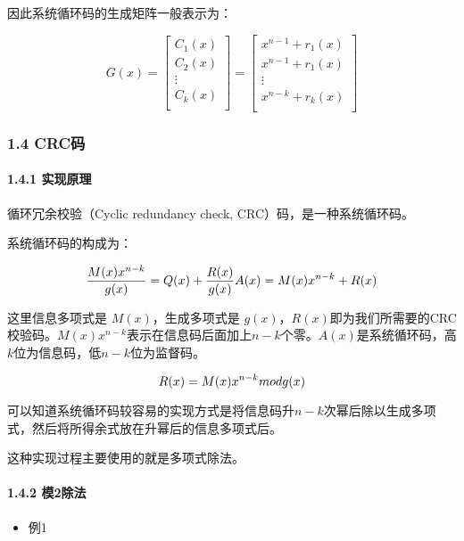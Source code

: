 \documentclass[
]{article}
\begin{document}
因此系统循环码的生成矩阵一般表示为：

$$G(x)=
\left[
\begin{matrix}
C_1(x)\\
C_2(x)\\
 \vdots \\
C_k(x)\\
\end{matrix}
\right]
=
\left[
\begin{matrix}
x^{n-1}+r_1(x)\\
x^{n-1}+r_1(x)\\
 \vdots \\
x^{n-k}+r_k(x)\\
\end{matrix}
\right]$$

\hypertarget{header-n78}{%
\subsubsection{1.4 CRC码}\label{header-n78}}

\hypertarget{header-n79}{%
\paragraph{1.4.1 实现原理}\label{header-n79}}

循环冗余校验（Cyclic redundancy check, CRC）码，是一种系统循环码。

系统循环码的构成为：

$$\frac{M(x)x^{n-k}}{g(x)} = Q(x) + \frac{R(x)}{g(x)}\\
A(x)=M(x)x^{n-k}+R(x)$$

这里信息多项式是 $M(x)$，生成多项式是
$g(x)$，$R(x)$即为我们所需要的CRC校验码。$M(x)x^{n-k}$表示在信息码后面加上$n-k$个零。$A(x)$是系统循环码，高$k$位为信息码，低$n-k$位为监督码。

$$R(x)=M(x)x^{n-k} \space mod \space g(x)$$

可以知道系统循环码较容易的实现方式是将信息码升$n-k$次幂后除以生成多项式，然后将所得余式放在升幂后的信息多项式后。

这种实现过程主要使用的就是多项式除法。

\hypertarget{header-n87}{%
\paragraph{1.4.2 模2除法}\label{header-n87}}

\begin{itemize}
\item
  例1
\end{itemize}
\end{document}
